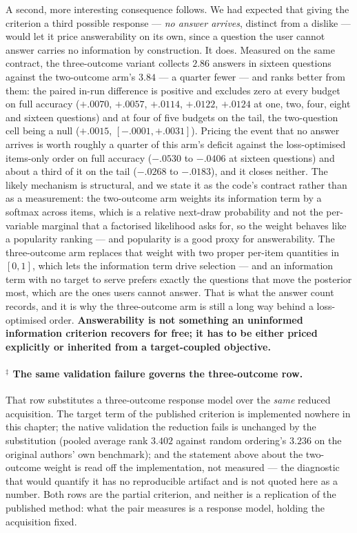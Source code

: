 \documentclass[11pt]{article}
\begin{document}
A second, more interesting consequence follows. We had expected that giving the criterion a third
possible response --- \emph{no answer arrives}, distinct from a dislike --- would let it price
answerability on its own, since a question the user cannot answer carries no information by
construction. It does. Measured on the same contract, the three-outcome variant collects $2.86$
answers in sixteen questions against the two-outcome arm's $3.84$ --- a quarter fewer --- and ranks
better from them: the paired in-run difference is positive and excludes zero at every budget on full
accuracy ($+.0070$, $+.0057$, $+.0114$, $+.0122$, $+.0124$ at one, two, four, eight and sixteen
questions) and at four of five budgets on the tail, the two-question cell being a null
($+.0015$, $[-.0001,+.0031]$). Pricing the event that no answer arrives is worth roughly a quarter
of this arm's deficit against the loss-optimised items-only order on full accuracy ($-.0530$ to
$-.0406$ at sixteen questions) and about a third of it on the tail ($-.0268$ to $-.0183$), and it
closes neither. The likely mechanism is structural, and we state it as the code's contract rather
than as a measurement: the two-outcome arm weights its information term by a softmax across items,
which is a relative next-draw probability and not the per-variable marginal that a factorised
likelihood asks for, so the weight behaves like a popularity ranking --- and popularity is a good
proxy for answerability. The three-outcome arm replaces that weight with two proper per-item
quantities in $[0,1]$, which lets the information term drive selection --- and an information term
with no target to serve prefers exactly the questions that move the posterior most, which are the
ones users cannot answer. That is what the answer count records, and it is why the three-outcome arm is
still a long way behind a loss-optimised order. \textbf{Answerability is not
something an uninformed information criterion recovers for free; it has to be either priced
explicitly or inherited from a target-coupled objective.}

\paragraph{$^\ddagger$ The same validation failure governs the three-outcome row.}
That row substitutes a three-outcome response model over the \emph{same} reduced acquisition. The target term of the
published criterion is implemented nowhere in this chapter; the native validation the reduction fails is
unchanged by the substitution (pooled average rank $3.402$ against random ordering's $3.236$ on the
original authors' own benchmark); and the statement above about the two-outcome weight is read off
the implementation, not measured --- the diagnostic that would quantify it has no reproducible
artifact and is not quoted here as a number. Both rows are the partial criterion, and neither is a
replication of the published method: what the pair measures is a response model, holding the
acquisition fixed.
\end{document}
